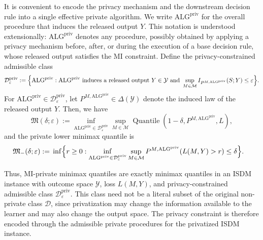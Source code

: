 \documentclass[journal]{IEEEtran}
\newcommand{\ALG}{\mathrm{ALG}}
\newcommand{\Quantile}{\operatorname{Quantile}}
\begin{document}
It is convenient to encode the privacy mechanism and the downstream decision
rule into a single effective private algorithm. We write \(\ALG^{\mathrm{priv}}\) for the
overall procedure that induces the released output \(Y\). This notation is
understood extensionally: \(\ALG^{\mathrm{priv}}\) denotes any procedure, possibly obtained by
applying a privacy mechanism before, after, or during the execution of a base
decision rule, whose released output satisfies the MI constraint. Define the
privacy-constrained admissible class
\[
\mathcal D_\varepsilon^{\mathrm{priv}}
:=
\Bigl\{
\ALG^{\mathrm{priv}} :
\ALG^{\mathrm{priv}} \text{ induces a released output } Y\in\mathcal Y
\text{ and }
\sup_{M\in\mathcal M}
I_{P^{M,\ALG^{\mathrm{priv}}}}(S;Y)\le \varepsilon
\Bigr\}.
\]
For \(\ALG^{\mathrm{priv}}\in\mathcal D_\varepsilon^{\mathrm{priv}}\), let
\(P^{M,\ALG^{\mathrm{priv}}}\in\Delta(\mathcal Y)\) denote the induced law of the released
output \(Y\). Then, we have
\begin{equation}
\mathfrak M(\delta;\varepsilon)
:=
\inf_{\ALG^{\mathrm{priv}}\in\mathcal D_\varepsilon^{\mathrm{priv}}}
\sup_{M\in\mathcal M}
\Quantile(1-\delta,P^{M,\ALG^{\mathrm{priv}}},L),
\label{eq:mi-private-composed}
\end{equation}
and the private lower minimax quantile is
\begin{align}
\mathfrak M_-(\delta;\varepsilon)
:={}&
\inf \Bigl\{
r\ge 0:
\inf_{\ALG^{\mathrm{priv}}\in\mathcal D_\varepsilon^{\mathrm{priv}}}
\sup_{M\in\mathcal M}
P^{M,\ALG^{\mathrm{priv}}}(L(M,Y)>r)\le \delta
\Bigr\}.
\label{eq:mi-private-lower}
\end{align}

Thus, MI-private minimax quantiles are exactly minimax quantiles in an ISDM
instance with outcome space \(\mathcal Y\), loss \(L(M,Y)\), and
privacy-constrained admissible class
\(\mathcal D_\varepsilon^{\mathrm{priv}}\). This class need not be a literal
subset of the original non-private class \(\mathcal D\), since privatization
may change the information available to the learner and may also change the
output space. The privacy constraint is therefore encoded through the
admissible private procedures for the privatized ISDM instance.
\end{document}
